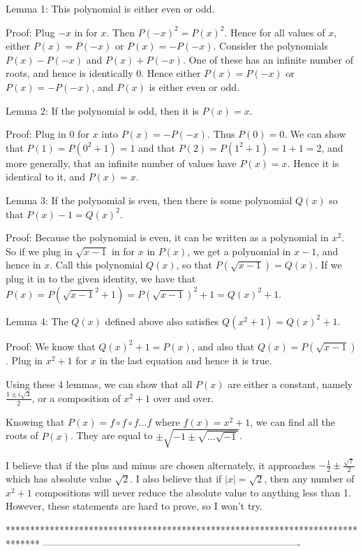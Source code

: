 \begin{solution}
	Lemma 1: This polynomial is either even or odd.

Proof: Plug $-x$ in for $x$.  Then $P(-x)^2=P(x)^2$.  Hence for all values of $x$, either $P(x)=P(-x)$ or $P(x)=-P(-x)$.  Consider the polynomials $P(x)-P(-x)$ and $P(x)+P(-x)$.  One of these has an infinite number of roots, and hence is identically 0.  Hence either $P(x)=P(-x)$ or $P(x)=-P(-x)$, and $P(x)$ is either even or odd.

Lemma 2: If the polynomial is odd, then it is $P(x)=x$.

Proof: Plug in 0 for $x$ into $P(x)=-P(-x)$.  Thus $P(0)=0$.  We can show that $P(1)=P(0^2+1)=1$ and that $P(2)=P(1^2+1)=1+1=2$, and more generally, that an infinite number of values have $P(x)=x$.  Hence it is identical to it, and $P(x)=x$.

Lemma 3: If the polynomial is even, then there is some polynomial $Q(x)$ so that $P(x)-1=Q(x)^2$.

Proof: Because the polynomial is even, it can be written as a polynomial in $x^2$.  So if we plug in $\sqrt{x-1}$ in for $x$ in $P(x)$, we get a polynomial in $x-1$, and hence in $x$.  Call this polynomial $Q(x)$, so that $P(\sqrt{x-1})=Q(x)$.  If we plug it in to the given identity, we have that $P(x)=P(\sqrt{x-1}^2+1)=P(\sqrt{x-1})^2+1=Q(x)^2+1$.

Lemma 4: The $Q(x)$ defined above also satisfies $Q(x^2+1)=Q(x)^2+1$.

Proof: We know that $Q(x)^2+1=P(x)$, and also that $Q(x)=P(\sqrt{x-1})$.  Plug in $x^2+1$ for $x$ in the last equation and hence it is true.

Using these 4 lemmas, we can show that all $P(x)$ are either a constant, namely $\frac{1\pm i\sqrt{3}}{2}$, or a composition of $x^2+1$ over and over.

Knowing that $P(x)=f\circ f\circ f\ldots f$ where $f(x)=x^2+1$, we can find all the roots of $P(x)$.  They are equal to $\pm\sqrt{-1\pm\sqrt{\ldots \sqrt{-1}}}$.

I believe that if the plus and minus are chosen alternately, it approaches $-\frac{1}{2}\pm\frac{\sqrt{7}}{2}$ which has absolute value $\sqrt{2}$.  I also believe that if $|x|=\sqrt{2}$, then any number of $x^2+1$ compositions will never reduce the absolute value to anything less than 1.  However, these statements are hard to prove, so I won't try.
\end{solution}
*******************************************************************************
-------------------------------------------------------------------------------

